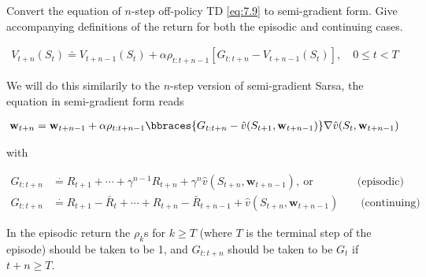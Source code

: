 
\begin{exercise}

Convert the equation of $n$-step off-policy TD \eqref{eq:7.9} to semi-gradient form.
Give accompanying definitions of the return for both the episodic and continuing cases.

\begin{align} \label{eq:7.9} \tag{7.9}
    V_{t+n}(S_t)
    \doteq
    V_{t+n-1}(S_t)
    +
    \alpha \rho_{t:t+n-1} [G_{t:t+n} - V_{t+n-1}(S_t)],
    \quad
    0 \leq t < T
\end{align}


\end{exercise}


\begin{solution}

We will do this similarily to the $n$-step version of semi-gradient Sarsa, the equation in semi-gradient form reads

\begin{align*}
  \textbf{w}_{t+n}
  =
  \textbf{w}_{t+n-1} + \alpha \rho_{t:t+n-1}\bbraces{G_{t:t+n} - \hat{v}(S_{t+1},\textbf{w}_{t+n-1})}\nabla\hat{v}(S_t, \textbf{w}_{t+n-1})
\end{align*}

with

\begin{align*}
  G_{t:t+n} &\stackrel{\cdot}{=}
  R_{t+1} + \cdots + \gamma^{n-1} R_{t+n} + \gamma^n \hat{v}(S_{t+n}, \textbf{w}_{t+n-1}), \  \text{or} \qquad \qquad \text{(episodic)} \\
  G_{t:t+n} &\stackrel{\cdot}{=}
  R_{t+1} - \bar{R}_t + \cdots + R_{t+n} - \bar{R}_{t+n-1} + \hat{v}(S_{t+n}, \textbf{w}_{t+n-1})\quad \quad  \text{(continuing)}
\end{align*}

In the episodic return the $\rho_k$s for $k\geq T$ (where $T$ is the terminal step of the episode) should be taken to be 1, and $G_{t:t+n}$ should be taken to be $G_t$ if $t+n \geq T$.

\end{solution}

